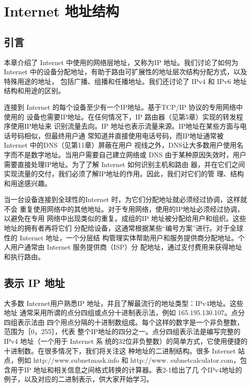 \chapter{Internet 地址结构}
\minitoc
\section{引言}
本章介绍了 Internet 中使用的网络层地址，又称为IP 地址。我们讨论了如何为 Internet
中的设备分配地址，有助于路由可扩展性的地址层次结构分配方式，以及特殊用途的地址，
包括广播、组播和任播地址。我们还讨论了 IPv4 和 IPv6 地址结构和用途的区别。

连接到 Internet 的每个设备至少有一个IP地址。基于TCP/IP 协议的专用网络中使用的
设备也需要IP地址。在任何情况下，IP 路由器（见第5章）实现的转发程序使用IP地址来
识别流量去向。IP 地址也表示流量来源。IP地址在某些方面与电话号码相似，但最终用户通
常知道并直接使用电话号码，而IP地址通常被 Internet 中的DNS（见第11章）屏蔽在用户
视线之外，DNS让大多数用户使用名字而不是数字地址。当用户需要自己建立网络或 DNS
由于某种原因失效时，用户需要直接处理IP地址。为了了解 Internet 如何识别主机和路由
器，并在它们之间实现流量的交付，我们必须了解IP地址的作用。因此，我们对它们的管
理、结构和用途感兴趣。

当一台设备连接到全球性的Internet 时，为它们分配地址就必须经过协调，这样就不会
重复使用网络中的其他地址。对于专用网络，使用的IP地址必须经过协调，以避免在专用
网络中出现类似的重复。成组的IP 地址被分配给用户和组织。这些地址的拥有者再将它们
分配给设备，这通常根据某些“编号方案”进行。对于全球性的 Internet 地址，一个分层结
构管理实体帮助用户和服务提供商分配地址。个人用户通常由 Internet 服务提供商（ISP）分
配地址，通过支付费用来获得地址和执行路由。

\section{表示 IP 地址}
大多数 Internet用户熟悉IP 地址，并且了解最流行的地址类型：IPv4地址。这些地址
通常采用所谓的点分四组或点分十进制表示法，例如 165.195.130.107。点分四组表示法由
四个用点分隔的十进制数组成。每个这样的数字是一个非负整数，范围为［0，255］，代表
整个IP地址的四分之一。点分四组表示法是编写完整的IPv4 地址（一个用于 Internet 系
统的32位非负整数）的简单方式，它使用便捷的十进制数。在很多情况下，我们将关注这
种地址的二进制结构。很多 Internet 站点，例如 http://www.subnetmask.info 和 http://www.
subnetcalculator.com，包含用于IP 地址和相关信息之间格式转换的计算器。表2-1给出了几
个IPv4地址的例子，以及对应的二进制表示，供大家开始学习。

